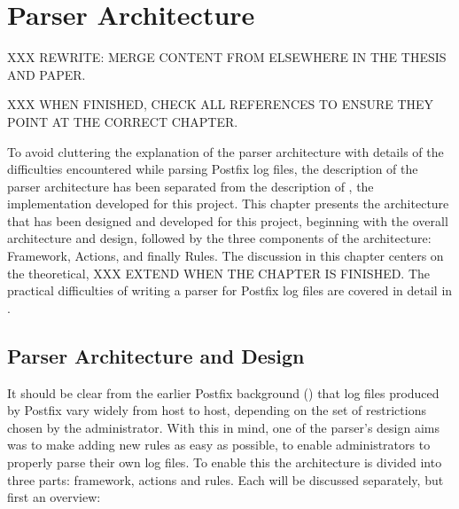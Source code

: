 \chapter{Parser Architecture}

\label{parser architecture}

XXX REWRITE\@: MERGE CONTENT FROM ELSEWHERE IN THE THESIS AND PAPER\@.

XXX WHEN FINISHED, CHECK ALL REFERENCES TO ENSURE THEY POINT AT THE CORRECT
CHAPTER\@.

To avoid cluttering the explanation of the parser architecture with details
of the difficulties encountered while parsing Postfix log files, the
description of the parser architecture has been separated from the
description of \parsername{}, the implementation developed for this
project.  This chapter presents the architecture that has been designed and
developed for this project, beginning with the overall architecture and
design, followed by the three components of the architecture: Framework,
Actions, and finally Rules.  The discussion in this chapter centers on the
theoretical, XXX EXTEND WHEN THE CHAPTER IS FINISHED\@.
The practical difficulties of writing a parser for Postfix log files are
covered in detail in .

\section{Parser Architecture and Design}

\label{parser design}

It should be clear from the earlier Postfix background () that log files produced by Postfix vary widely from host to
host, depending on the set of restrictions chosen by the administrator.
With this in mind, one of the parser's design aims was to make adding new
rules as easy as possible, to enable administrators to properly parse their
own log files.  To enable this the architecture is divided into three
parts: framework, actions and rules.  Each will be discussed separately,
but first an overview:

